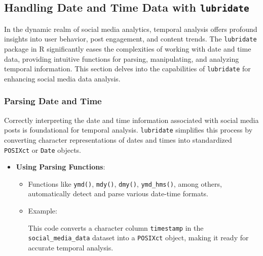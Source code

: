\documentclass[
]{book}
\newenvironment{Shaded}{\begin{snugshade}}{\end{snugshade}}
\newcommand{\FunctionTok}[1]{\textcolor[rgb]{0.13,0.29,0.53}{\textbf{#1}}}
\newcommand{\NormalTok}[1]{#1}
\newcommand{\OtherTok}[1]{\textcolor[rgb]{0.56,0.35,0.01}{#1}}
\newcommand{\SpecialCharTok}[1]{\textcolor[rgb]{0.81,0.36,0.00}{\textbf{#1}}}
\providecommand{\tightlist}{%
  \setlength{\itemsep}{0pt}\setlength{\parskip}{0pt}}
\begin{document}
\hypertarget{handling-date-and-time-data-with-lubridate}{%
\subsection{\texorpdfstring{Handling Date and Time Data with \texttt{lubridate}}{Handling Date and Time Data with lubridate}}\label{handling-date-and-time-data-with-lubridate}}

In the dynamic realm of social media analytics, temporal analysis offers profound insights into user behavior, post engagement, and content trends. The \texttt{lubridate} package in R significantly eases the complexities of working with date and time data, providing intuitive functions for parsing, manipulating, and analyzing temporal information. This section delves into the capabilities of \texttt{lubridate} for enhancing social media data analysis.

\hypertarget{parsing-date-and-time}{%
\subsubsection{Parsing Date and Time}\label{parsing-date-and-time}}

Correctly interpreting the date and time information associated with social media posts is foundational for temporal analysis. \texttt{lubridate} simplifies this process by converting character representations of dates and times into standardized \texttt{POSIXct} or \texttt{Date} objects.

\begin{itemize}
\tightlist
\item
  \textbf{Using Parsing Functions}:

  \begin{itemize}
  \item
    Functions like \texttt{ymd()}, \texttt{mdy()}, \texttt{dmy()}, \texttt{ymd\_hms()}, among others, automatically detect and parse various date-time formats.
  \item
    Example:

\begin{Shaded}
\end{Shaded}

    This code converts a character column \texttt{timestamp} in the \texttt{social\_media\_data} dataset into a \texttt{POSIXct} object, making it ready for accurate temporal analysis.
  \end{itemize}
\end{itemize}
\end{document}
